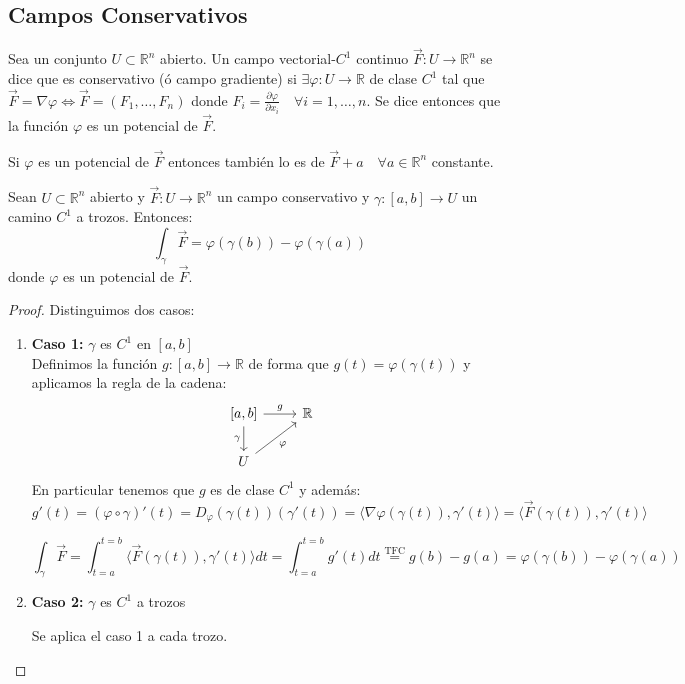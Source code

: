 \subsection{Campos Conservativos}

\begin{definición} 
Sea un conjunto $U  \subset \mathbb{R}^n$ abierto. Un campo vectorial-$C^1$ continuo $\vec{F}: U \to \mathbb{R}^n$ se dice que es conservativo (ó campo gradiente) si $\exists \varphi: U \to \mathbb{R}$ de clase $C^1$ tal que $\vec{F} = \nabla \varphi \iff \vec{F} = (F_1, \ldots, F_n)$ donde $F_i = \frac{\partial \varphi}{\partial x_i} \quad \forall i = 1, \ldots, n$.
Se dice entonces que la función $\varphi$ es un potencial de $\vec{F}$.
\end{definición}

\begin{observación}
Si $\varphi$ es un potencial de $\vec{F}$ entonces también lo es de $\vec{F} + a \quad \forall a \in \mathbb{R}^n$ constante.
\end{observación}

\begin{proposición}
Sean $U \subset \mathbb{R}^n$ abierto y $\vec{F}: U \to \mathbb{R}^n$ un campo conservativo y $\gamma: [a,b] \to U$ un camino $C^1$ a trozos. Entonces:
$$\int_{\gamma} \vec{F} = \varphi(\gamma(b)) - \varphi(\gamma(a))$$
donde $\varphi$ es un potencial de $\vec{F}$.
\end{proposición}

\begin{proof}
    Distinguimos dos casos:
    \begin{enumerate}
        \item \textbf{Caso 1:} $\gamma$ es $C^1$ en $[a,b]$\\
              Definimos la función $g: [a,b] \to \mathbb{R}$ de forma que $g(t) = \varphi(\gamma(t))$ y aplicamos la regla de la cadena:
              \[
                  \begin{tikzcd}
                      {[a,b]} \arrow[d, "\gamma"'] \arrow[r, "g"] & \mathbb{R} \\
                      U \arrow[ru, "\varphi"']
                  \end{tikzcd}
              \]
              En particular tenemos que $g$ es de clase $C^1$ y además:
              \[
                  g'(t) = (\varphi \circ \gamma)'(t) = D_\varphi (\gamma(t)) (\gamma'(t)) = \langle \nabla \varphi (\gamma(t)), \gamma'(t) \rangle = \langle \vec{F}(\gamma(t)), \gamma'(t) \rangle
              \]

              \[
                  \int_{\gamma} \vec{F} = \int_{t=a}^{t=b} \langle \vec{F} (\gamma(t)), \gamma'(t) \rangle dt = \int_{t=a}^{t=b} g'(t) dt \overset{\text{TFC}}{=} g(b) - g(a) = \varphi (\gamma(b)) - \varphi (\gamma(a))
              \]

        \item \textbf{Caso 2:} \(\gamma\) es \(C^1\) a trozos

              Se aplica el caso 1 a cada trozo.
    \end{enumerate}
\end{proof}

